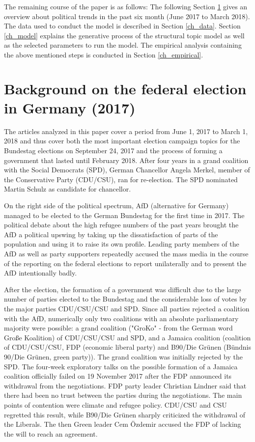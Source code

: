 \documentclass[12pt,a4paper,notitlepage]{article}
\begin{document}
The remaining course of the paper is as follows: The following Section \ref{ch_elections} gives an overview about political trends in the past six month (June 2017 to March 2018). The data used to conduct the model is described in Section \ref{ch_data}. Section \ref{ch_model} explains the generative process of the structural topic model as well as the selected parameters to run the model. The empirical analysis containing the above mentioned steps is conducted in Section \ref{ch_empirical}. 
 
\section{Background on the federal election in Germany (2017)}\label{ch_elections}

The articles analyzed in this paper cover a period from June 1, 2017 to March 1, 2018 and thus cover both the most important election campaign topics for the Bundestag elections on September 24, 2017 and the process of forming a government that lasted until February 2018. After four years in a grand coalition with the Social Democrats (SPD), German Chancellor Angela Merkel, member of the Conservative Party (CDU/CSU), ran for re-election. The SPD nominated Martin Schulz as candidate for chancellor. 

On the right side of the political spectrum, AfD (alternative for Germany) managed to be elected to the German Bundestag for the first time in 2017. The political debate about the high refugee numbers of the past years brought the AfD a political upswing by taking up the dissatisfaction of parts of the population and using it to raise its own profile. Leading party members of the AfD as well as party supporters repeatedly accused the mass media in the course of the reporting on the federal elections to report unilaterally and to present the AfD intentionally badly.

After the election, the formation of a government was difficult due to the large number of parties elected to the Bundestag and the considerable loss of votes by the major parties CDU/CSU/CSU and SPD. Since all parties rejected a coalition with the AfD, numerically only two coalitions with an absolute parliamentary majority were possible: a grand coalition ("GroKo" - from the German word Große Koalition) of CDU/CSU/CSU and SPD, and a Jamaica coalition (coalition of CDU/CSU/CSU, FDP (economic liberal party) and B90/Die Grünen (Bündnis 90/Die Grünen, green party)). The grand coalition was initially rejected by the SPD. The four-week exploratory talks on the possible formation of a Jamaica coalition officially failed on 19 November 2017 after the FDP announced its withdrawal from the negotiations. FDP party leader Christian Lindner said that there had been no trust between the parties during the negotiations. The main points of contention were climate and refugee policy. CDU/CSU and CSU regretted this result, while B90/Die Grünen sharply criticized the withdrawal of the Liberals. The then Green leader Cem Özdemir accused the FDP of lacking the will to reach an agreement.
\end{document}
